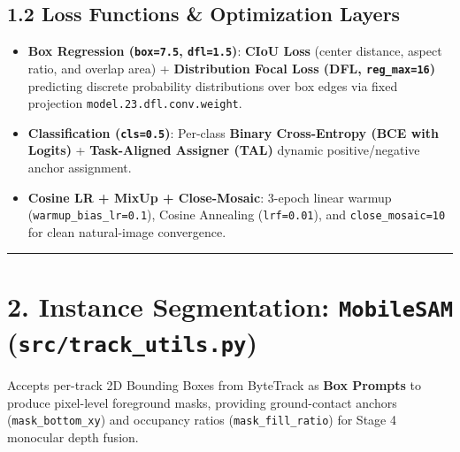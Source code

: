 \documentclass[10.5pt,a4paper]{article}
\begin{document}
\subsection{1.2 Loss Functions \& Optimization Layers}
\begin{itemize}[leftmargin=1.5em,itemsep=2pt]
\item \textbf{Box Regression (\texttt{box=7.\allowbreak{}5}, \texttt{dfl=1.\allowbreak{}5})}: \textbf{CIoU Loss} (center distance, aspect ratio, and overlap area) + \textbf{Distribution Focal Loss (DFL, \texttt{reg\_\allowbreak{}max=16})} predicting discrete probability distributions over box edges via fixed projection \texttt{model.\allowbreak{}23.\allowbreak{}dfl.\allowbreak{}conv.\allowbreak{}weight}.
\item \textbf{Classification (\texttt{cls=0.\allowbreak{}5})}: Per-class \textbf{Binary Cross-Entropy (BCE with Logits)} + \textbf{Task-Aligned Assigner (TAL)} dynamic positive/negative anchor assignment.
\item \textbf{Cosine LR + MixUp + Close-Mosaic}: 3-epoch linear warmup (\texttt{warmup\_\allowbreak{}bias\_\allowbreak{}lr=0.\allowbreak{}1}), Cosine Annealing (\texttt{lrf=0.\allowbreak{}01}), and \texttt{close\_\allowbreak{}mosaic=10} for clean natural-image convergence.
\end{itemize}

\par\noindent\rule{\textwidth}{0.4pt}\par\medskip

\section{2. Instance Segmentation: \texttt{MobileSAM} (\texttt{src/\allowbreak{}track\_\allowbreak{}utils.\allowbreak{}py})}

Accepts per-track 2D Bounding Boxes from ByteTrack as \textbf{Box Prompts} to produce pixel-level foreground masks, providing ground-contact anchors (\texttt{mask\_\allowbreak{}bottom\_\allowbreak{}xy}) and occupancy ratios (\texttt{mask\_\allowbreak{}fill\_\allowbreak{}ratio}) for Stage 4 monocular depth fusion.
\end{document}
